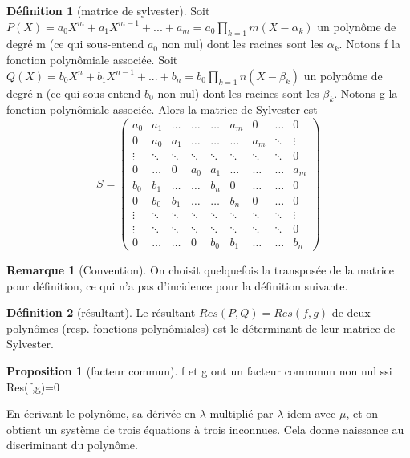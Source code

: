 \documentclass{article}
\theoremstyle{definition} %
\newtheorem{defi}{Définition}
\newtheorem{rmq}{Remarque}
\newtheorem{prop}{Proposition}
\newcommand{\1}{\mathbb{1}} %
\begin{document}
\begin{defi}[matrice de sylvester]
Soit $P(X)=a_0 X^m + a_1 X^{m-1} + ... + a_m = a_0 \prod_{k=1}{m} (X- \alpha_k)$ un polynôme de degré m (ce qui sous-entend $a_0$ non nul) dont les racines sont les $\alpha_k$. Notons f la fonction polynômiale associée.
Soit $Q(X)=b_0 X^n + b_1 X^{n-1} + ... + b_n = b_0 \prod_{k=1}{n} (X- \beta_k)$ un polynôme de degré n (ce qui sous-entend $b_0$ non nul) dont les racines sont les $\beta_k$. Notons g la fonction polynômiale associée.
Alors la matrice de Sylvester est
$$S=
\begin{pmatrix}
a_0 & a_1 & \dots & \dots & \dots & a_m & 0 & \dots & 0 \\
0 & a_0 & a_1 & \dots & \dots & \dots & a_m & \ddots & \vdots \\
\vdots & \ddots & \ddots & \ddots & \ddots & \ddots & \ddots & \ddots & 0 \\
0 & \dots & 0 & a_0 & a_1 & \dots & \dots & \dots & a_m \\
b_0 & b_1 & \dots & \dots & b_n & 0 & \dots & \dots & 0 \\
0 & b_0 & b_1 & \dots & \dots & b_n & 0 & \dots & 0 \\
\vdots & \ddots & \ddots & \ddots & \ddots & \ddots & \ddots & \ddots & \vdots \\
\vdots & \ddots & \ddots & \ddots & \ddots & \ddots & \ddots & \ddots & 0 \\
0 & \dots & \dots & 0 & b_0 & b_1 & \dots & \dots & b_n
\end{pmatrix}
$$
\end{defi}

\begin{rmq}[Convention]
On choisit quelquefois la transposée de la matrice pour définition, ce qui n'a pas d'incidence pour la définition suivante.
\end{rmq}

\begin{defi}[résultant]
Le résultant $Res(P,Q)=Res(f,g)$ de deux polynômes (resp. fonctions polynômiales) est le déterminant de leur matrice de Sylvester.
\end{defi}

\begin{prop}[facteur commun]
f et g ont un facteur commmun non nul ssi Res(f,g)=0
\end{prop}


En écrivant le polynôme, sa dérivée en $\lambda$ multiplié par $\lambda$ idem avec $\mu$, et on obtient un système de trois équations à trois inconnues.
Cela donne naissance au discriminant du polynôme.
\end{document}
